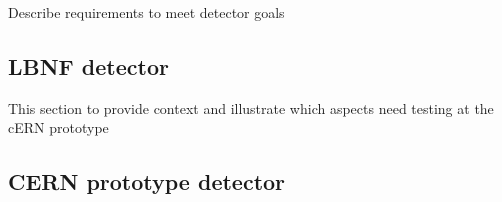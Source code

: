 Describe requirements to meet detector goals

\subsection{LBNF detector}
This section to provide context and illustrate which aspects need testing at the cERN prototype

\subsection{CERN prototype detector}

